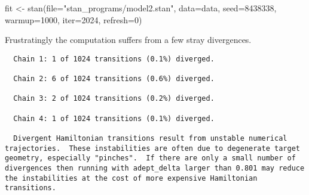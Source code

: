 \documentclass[
  letterpaper,
  DIV=11,
  numbers=noendperiod]{scrartcl}
\newenvironment{Shaded}{\begin{snugshade}}{\end{snugshade}}
\newcommand{\AttributeTok}[1]{\textcolor[rgb]{0.40,0.45,0.13}{#1}}
\newcommand{\ConstantTok}[1]{\textcolor[rgb]{0.56,0.35,0.01}{#1}}
\newcommand{\DecValTok}[1]{\textcolor[rgb]{0.68,0.00,0.00}{#1}}
\newcommand{\FunctionTok}[1]{\textcolor[rgb]{0.28,0.35,0.67}{#1}}
\newcommand{\NormalTok}[1]{\textcolor[rgb]{0.00,0.23,0.31}{#1}}
\newcommand{\OtherTok}[1]{\textcolor[rgb]{0.00,0.23,0.31}{#1}}
\newcommand{\SpecialCharTok}[1]{\textcolor[rgb]{0.37,0.37,0.37}{#1}}
\newcommand{\StringTok}[1]{\textcolor[rgb]{0.13,0.47,0.30}{#1}}
\begin{document}
\begin{Shaded}
\begin{Highlighting}[]
\NormalTok{fit }\OtherTok{\textless{}{-}} \FunctionTok{stan}\NormalTok{(}\AttributeTok{file=}\StringTok{"stan\_programs/model2.stan"}\NormalTok{,}
            \AttributeTok{data=}\NormalTok{data, }\AttributeTok{seed=}\DecValTok{8438338}\NormalTok{,}
            \AttributeTok{warmup=}\DecValTok{1000}\NormalTok{, }\AttributeTok{iter=}\DecValTok{2024}\NormalTok{, }\AttributeTok{refresh=}\DecValTok{0}\NormalTok{)}
\end{Highlighting}
\end{Shaded}

Frustratingly the computation suffers from a few stray divergences.

\begin{Shaded}
\end{Shaded}

\begin{verbatim}
  Chain 1: 1 of 1024 transitions (0.1%) diverged.

  Chain 2: 6 of 1024 transitions (0.6%) diverged.

  Chain 3: 2 of 1024 transitions (0.2%) diverged.

  Chain 4: 1 of 1024 transitions (0.1%) diverged.

  Divergent Hamiltonian transitions result from unstable numerical
trajectories.  These instabilities are often due to degenerate target
geometry, especially "pinches".  If there are only a small number of
divergences then running with adept_delta larger than 0.801 may reduce
the instabilities at the cost of more expensive Hamiltonian
transitions.
\end{verbatim}

\begin{Shaded}
\end{Shaded}
\end{document}
